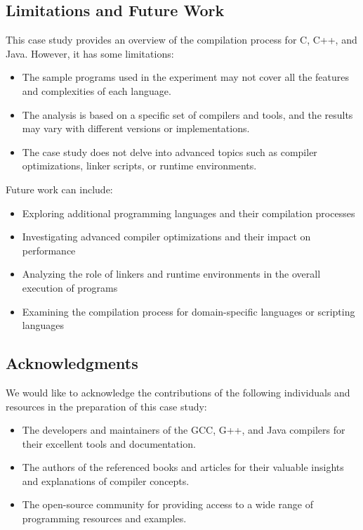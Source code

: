 \documentclass[12pt]{article}
\begin{document}
\subsection*{Limitations and Future Work}
This case study provides an overview of the compilation process for C, C++, and Java. However, it has some limitations:
\begin{itemize}
    \item The sample programs used in the experiment may not cover all the features and complexities of each language.
    \item The analysis is based on a specific set of compilers and tools, and the results may vary with different versions or implementations.
    \item The case study does not delve into advanced topics such as compiler optimizations, linker scripts, or runtime environments.
\end{itemize}

Future work can include:
\begin{itemize}
    \item Exploring additional programming languages and their compilation processes
    \item Investigating advanced compiler optimizations and their impact on performance
    \item Analyzing the role of linkers and runtime environments in the overall execution of programs
    \item Examining the compilation process for domain-specific languages or scripting languages
\end{itemize}

\subsection*{Acknowledgments}
We would like to acknowledge the contributions of the following individuals and resources in the preparation of this case study:
\begin{itemize}
    \item The developers and maintainers of the GCC, G++, and Java compilers for their excellent tools and documentation.
    \item The authors of the referenced books and articles for their valuable insights and explanations of compiler concepts.
    \item The open-source community for providing access to a wide range of programming resources and examples.
\end{itemize}
\end{document}
